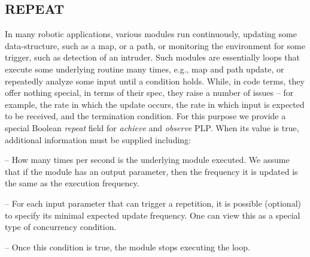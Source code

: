 \documentclass[ 5p, 12pt, times, twocolumn, sort&compress ]{elsarticle}
\newcommand\mNote[1]{\todo[inline, author=Michael, color=cyan]{#1}}
\begin{document}
%
%
%
%
%
%
%
%
%
%
%

\subsection{REPEAT}
In many robotic applications, various modules run continuously, updating some data-structure, such as a map, or a path,
or monitoring the environment for some trigger, such as detection of an intruder. Such modules are essentially loops that
execute some underlying routine many times, e.g., map and path update, or repeatedly analyze some input until a condition holds.
While, in code terms, they offer nothing special, in terms of their spec, they raise a number of issues -- for example, the rate in which the update occurs, the rate in which input is expected to be received, and the termination condition. For this purpose we provide a special Boolean {\em repeat\/} field for {\em achieve} and {\em observe} PLP. When its value is true, additional information must be supplied including:

 -- How many times per second is the underlying module executed.
 We assume that if the module has an output parameter, then the frequency it is updated is the same as the execution frequency.

 -- For each input parameter that
can trigger a repetition, it is possible (optional) to specify its minimal expected update frequency. One can view this as a special type of concurrency condition. 

 -- Once this condition is true, the module stops executing the loop. 
\end{document}
